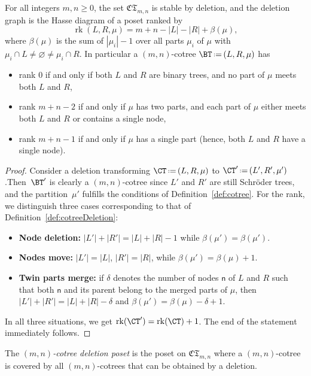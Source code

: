 \documentclass[AHL,Unicode,longabstracts,published]{cedram}
\DeclareMathOperator{\rank}{rk}
\newcommand{\f}[1]{\mathfrak{#1}}
\newcommand{\eqdef}{\mbox{\,\raisebox{0.2ex}{\scriptsize\ensuremath{\mathrm:}}\ensuremath{=}\,}}
\newcommand{\node}[1]{\mathsf{#1}}
\begin{document}
\begin{prop}\label{prop:cotreeDeletion}
For all integers $m, n \ge 0$, the set $\f{CT}_{m,n}$ is stable by deletion, and the deletion graph is the Hasse diagram of a poset ranked by
\[
\rank(L, R, \mu) = m + n - |L| - |R| + \beta(\mu),
\]
where $\beta(\mu)$ is the sum of $|\mu_i|-1$ over all parts $\mu_i$ of $\mu$ with $\mu_i \cap L \ne \varnothing \ne \mu_i \cap R$. In particular a $(m,n)$-cotree $\BT \eqdef (L, R, \mu)$ has
\begin{itemize}
\item rank $0$ if and only if both $L$ and $R$ are binary trees, and no part of $\mu$ meets both $L$ and $R$,
\item rank $m+n-2$ if and only if $\mu$ has two parts, and each part of $\mu$ either meets both $L$ and $R$ or contains a single node,
\item rank $m+n-1$ if and only if $\mu$ has a single part (hence, both $L$ and $R$ have a single node).
\end{itemize}
\end{prop}

\begin{proof}
Consider a deletion transforming $\CT \eqdef (L, R, \mu)$ to $\CT' \eqdef (L', R', \mu')$.\linebreak Then~$\BT'$ is clearly a $(m,n)$-cotree since $L'$ and $R'$ are still Schr\"oder trees, and the partition~$\mu'$ fulfills the conditions of Definition~\ref{def:cotree}. For the rank, we distinguish three cases corresponding to that of Definition~\ref{def:cotreeDeletion}:
\begin{itemize}
\item[\eqref{defi4.2.1}] \textbf{Node deletion:} $|L'| + |R'| = |L| + |R| - 1$ while $\beta(\mu') = \beta(\mu')$.
\item[\eqref{defi4.2.2}] \textbf{Nodes move:} $|L'| = |L|$, $|R'| = |R|$, while $\beta(\mu') = \beta(\mu) + 1$.
\item[\eqref{defi4.2.3}] \textbf{Twin parts merge:} if $\delta$ denotes the number of nodes $\node{n}$ of $L$ and $R$ such that both $\node{n}$ and its parent belong to the merged parts of $\mu$, then $|L'| + |R'| = |L| + |R| - \delta$ and $\beta(\mu') = \beta(\mu) - \delta + 1$.
\end{itemize}
In all three situations, we get $\rank(\CT') = \rank(\CT)+1$. The end of the statement immediately follows.
\end{proof}

\begin{defi}\label{def:cotreeDeletionPoset}
The
\emph{$(m,n)$-cotree deletion poset} is the poset on $\f{CT}_{m,n}$ where a $(m,n)$-cotree is covered by all $(m,n)$-cotrees that can be obtained by a deletion.
\end{defi}
\end{document}
